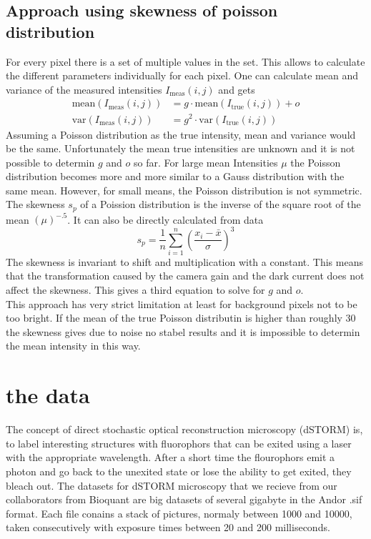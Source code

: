\subsection{Approach using skewness of poisson distribution}
For every pixel there is a set of multiple values in the set. This allows to
calculate the different parameters individually for each pixel. One can
calculate mean and variance of the measured intensities $I_\text{meas}(i,j)$ and
gets
\begin{align}
	\text{mean}(I_\text{meas}(i,j))& = g\cdot \text{mean}(I_\text{true}(i,j)) + o \label{meanvarPoiss1}\\
	\text{var}(I_\text{meas}(i,j))& = g^2\cdot\text{var}(I_\text{true}(i,j)) \label{meanvarPoiss2}
\end{align}
Assuming a Poisson distribution as the true intensity, mean and variance would
be the same. Unfortunately the mean true intensities are unknown and it is
not possible to determin $g$ and $o$ so far. For large mean Intensities $\mu$
the Poisson distribution becomes more and more similar to a Gauss distribution
with the same mean. However, for small means, the Poisson distribution is not
symmetric. The skewness $s_p$ of a Poission distribution is the inverse of the
square root of the mean $(\mu)^{-.5}$. It can also be directly
calculated from data
\begin{equation}
	s_p = \frac{1}{n}\sum_{i = 1}^n \left(\frac{x_i - \bar x}{\sigma}\right)^3
\end{equation}
The skewness is invariant to shift and multiplication with a constant. This
means that the transformation caused by the camera gain and the dark current
does not affect the skewness. This gives a third equation to solve for $g$ and
$o$.\\
This approach has very strict limitation at least for background pixels not to be too
bright. If the mean of the true Poisson distributin is higher than
roughly 30 the skewness gives due to noise no stabel results and it is
impossible to determin the mean intensity in this way.


\section{the data}
The concept of direct stochastic optical reconstruction microscopy (dSTORM) \cite{heilemann} is, to label interesting structures with fluorophors that can be exited using a laser with the appropriate wavelength. After a short time the flourophors emit a photon and go back to the unexited state or lose the ability to get exited, they bleach out.
The datasets for dSTORM microscopy that we recieve from our collaborators from
Bioquant are big datasets of several gigabyte in the Andor .sif format. Each
file conains a stack of pictures, normaly between 1000 and 10000, taken
consecutively with exposure times between 20 and 200 milliseconds.\newline

